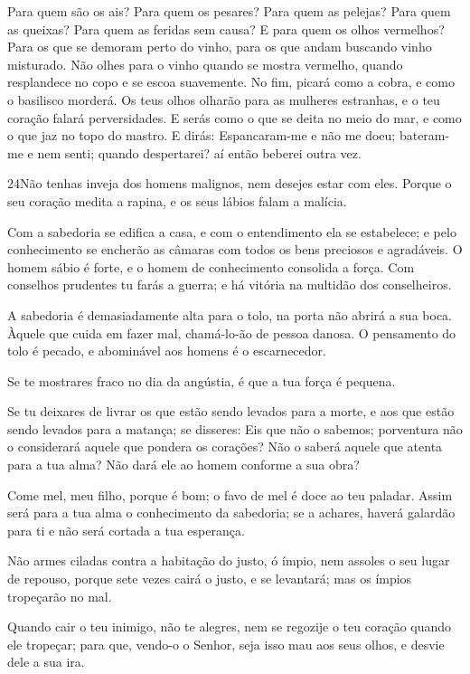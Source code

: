 Para quem são os ais? Para quem os pesares? Para quem as pelejas?
Para quem as queixas? Para quem as feridas sem causa? E para quem os
olhos vermelhos? Para os que se demoram perto do vinho, para
os que andam buscando vinho misturado. Não olhes para o vinho
quando se mostra vermelho, quando resplandece no copo e se escoa
suavemente. No fim, picará como a cobra, e como o basilisco
morderá. Os teus olhos olharão para as mulheres estranhas, e
o teu coração falará perversidades. E serás como o que se
deita no meio do mar, e como o que jaz no topo do mastro. E
dirás: Espancaram-me e não me doeu; bateram-me e nem senti; quando
despertarei? aí então beberei outra vez.

\medskip

\lettrine{24}{}Não tenhas inveja dos homens malignos, nem
desejes estar com eles. Porque o seu coração medita a rapina, e
os seus lábios falam a malícia.

Com a sabedoria se edifica a casa, e com o entendimento ela se
estabelece; e pelo conhecimento se encherão as câmaras com todos
os bens preciosos e agradáveis. O homem sábio é forte, e o homem
de conhecimento consolida a força. Com conselhos prudentes tu
farás a guerra; e há vitória na multidão dos conselheiros.

A sabedoria é demasiadamente alta para o tolo, na porta não abrirá
a sua boca. Àquele que cuida em fazer mal, chamá-lo-ão de pessoa
danosa. O pensamento do tolo é pecado, e abominável aos homens é
o escarnecedor.

Se te mostrares fraco no dia da angústia, é que a tua força é
pequena.

Se tu deixares de livrar os que estão sendo levados para a morte,
e aos que estão sendo levados para a matança; se disseres:
Eis que não o sabemos; porventura não o considerará aquele que
pondera os corações? Não o saberá aquele que atenta para a tua alma?
Não dará ele ao homem conforme a sua obra?

Come mel, meu filho, porque é bom; o favo de mel é doce ao teu
paladar. Assim será para a tua alma o conhecimento da
sabedoria; se a achares, haverá galardão para ti e não será cortada
a tua esperança.

Não armes ciladas contra a habitação do justo, ó ímpio, nem
assoles o seu lugar de repouso, porque sete vezes cairá o
justo, e se levantará; mas os ímpios tropeçarão no mal.

Quando cair o teu inimigo, não te alegres, nem se regozije o teu
coração quando ele tropeçar; para que, vendo-o o Senhor, seja
isso mau aos seus olhos, e desvie dele a sua ira.

